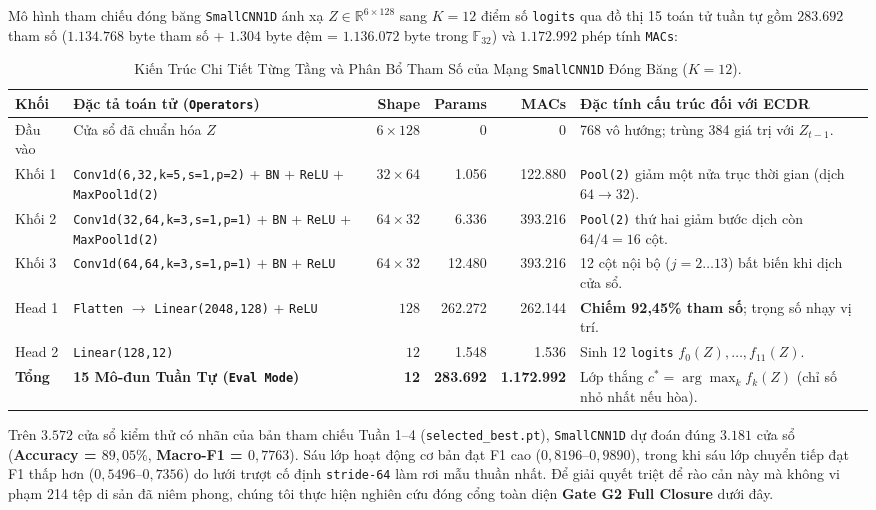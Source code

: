 \documentclass[11pt,a4paper]{article}
\newcommand{\R}{\mathbb{R}}
\newcommand{\F}{\mathbb{F}}
\newcommand{\code}[1]{{\small\ttfamily\nolinkurl{#1}}}
\theoremstyle{remark}
\begin{document}
Mô hình tham chiếu đóng băng \code{SmallCNN1D} ánh xạ $Z \in \R^{6 \times 128}$ sang $K=12$ điểm số \code{logits} qua đồ thị 15 toán tử tuần tự gồm $283.692$ tham số ($1.134.768$ byte tham số + $1.304$ byte đệm = $1.136.072$ byte trong $\F_{32}$) và $1.172.992$ phép tính \code{MACs}:

\begin{table}[!htbp]
\centering\footnotesize
\caption{Kiến Trúc Chi Tiết Từng Tầng và Phân Bổ Tham Số của Mạng \code{SmallCNN1D} Đóng Băng ($K=12$).}
\label{tab:arch_vi}
\begin{tabularx}{\linewidth}{@{}lP{4.7cm}rrrY@{}}
\toprule
\textbf{Khối} & \textbf{Đặc tả toán tử (\code{Operators})} & \textbf{Shape} & \textbf{Params} & \textbf{MACs} & \textbf{Đặc tính cấu trúc đối với ECDR} \\
\midrule
Đầu vào & Cửa sổ đã chuẩn hóa $Z$ & $6 \times 128$ & 0 & 0 & 768 vô hướng; trùng 384 giá trị với $Z_{t-1}$. \\
Khối 1 & \code{Conv1d(6,32,k=5,s=1,p=2)} + \code{BN} + \code{ReLU} + \code{MaxPool1d(2)} & $32 \times 64$ & 1.056 & 122.880 & \code{Pool(2)} giảm một nửa trục thời gian (dịch $64 \to 32$). \\
Khối 2 & \code{Conv1d(32,64,k=3,s=1,p=1)} + \code{BN} + \code{ReLU} + \code{MaxPool1d(2)} & $64 \times 32$ & 6.336 & 393.216 & \code{Pool(2)} thứ hai giảm bước dịch còn $64/4 = 16$ cột. \\
Khối 3 & \code{Conv1d(64,64,k=3,s=1,p=1)} + \code{BN} + \code{ReLU} & $64 \times 32$ & 12.480 & 393.216 & 12 cột nội bộ ($j=2\dots13$) bất biến khi dịch cửa sổ. \\
Head 1 & \code{Flatten} $\to$ \code{Linear(2048,128)} + \code{ReLU} & $128$ & 262.272 & 262.144 & \textbf{Chiếm 92,45\% tham số}; trọng số nhạy vị trí. \\
Head 2 & \code{Linear(128,12)} & $12$ & 1.548 & 1.536 & Sinh 12 \code{logits} $f_0(Z),\dots,f_{11}(Z)$. \\
\midrule
\textbf{Tổng} & \textbf{15 Mô-đun Tuần Tự (\code{Eval Mode})} & \textbf{12} & \textbf{283.692} & \textbf{1.172.992} & Lớp thắng $c^* = \arg\max_k f_k(Z)$ (chỉ số nhỏ nhất nếu hòa). \\
\bottomrule
\end{tabularx}
\end{table}

Trên $3.572$ cửa sổ kiểm thử có nhãn của bản tham chiếu Tuần 1--4 (\code{selected\_best.pt}), \code{SmallCNN1D} dự đoán đúng $3.181$ cửa sổ (\textbf{Accuracy = $89,05\%$}, \textbf{Macro-F1 = $0,7763$}). Sáu lớp hoạt động cơ bản đạt F1 cao ($0,8196$--$0,9890$), trong khi sáu lớp chuyển tiếp đạt F1 thấp hơn ($0,5496$--$0,7356$) do lưới trượt cố định \code{stride-64} làm rơi mẫu thuần nhất. Để giải quyết triệt để rào cản này mà không vi phạm 214 tệp di sản đã niêm phong, chúng tôi thực hiện nghiên cứu đóng cổng toàn diện \textbf{Gate G2 Full Closure} dưới đây.
\end{document}
